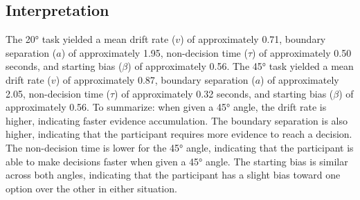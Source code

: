 \documentclass[12pt]{article}
\begin{document}
\subsection{Interpretation}
The 20° task yielded a mean drift rate ($v$) of approximately 0.71, boundary separation ($a$) of approximately 1.95, non-decision time ($\tau$) of approximately 0.50 seconds, and starting bias ($\beta$) of approximately 0.56. The 45° task yielded a mean drift rate ($v$) of approximately 0.87, boundary separation ($a$) of approximately 2.05, non-decision time ($\tau$) of approximately 0.32 seconds, and starting bias ($\beta$) of approximately 0.56. To summarize: when given a 45° angle, the drift rate is higher, indicating faster evidence accumulation. The boundary separation is also higher, indicating that the participant requires more evidence to reach a decision. The non-decision time is lower for the 45° angle, indicating that the participant is able to make decisions faster when given a 45° angle. The starting bias is similar across both angles, indicating that the participant has a slight bias toward one option over the other in either situation.
\end{document}
